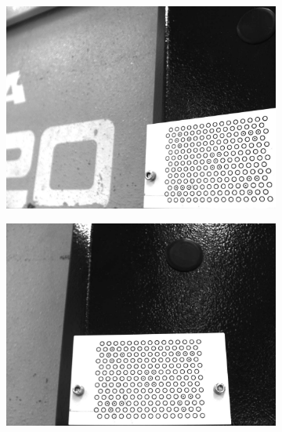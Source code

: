 \begin{figure}[h]
\begin{subfigure}{0.32\textwidth}
        \includegraphics[width=\textwidth]{figures/001calibration/calibration4.png}
    \end{subfigure}
    \begin{subfigure}{0.32\textwidth}
        \centering
        \includegraphics[width=\textwidth]{figures/001calibration/calibration5.PNG}
    \end{subfigure}
    \begin{subfigure}{0.32\textwidth}
        \centering

\end{subfigure}
\end{figure}
